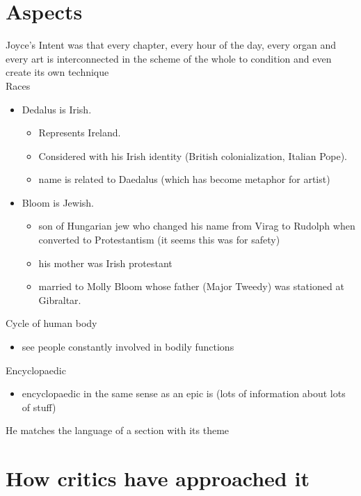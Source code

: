 \documentclass[12pt]{article}
\begin{document}
	\section{Aspects}
		Joyce's Intent was that every chapter, every hour of the day,
		every organ and every art is interconnected in the scheme of the
		whole to condition and even create its own technique \\
		Races
			\begin{itemize}
				\item Dedalus is Irish.
					\begin{itemize}
						\item Represents Ireland.
						\item Considered with his Irish identity
						(British colonialization,
						Italian Pope).
						\item name is related to Daedalus (which has become
						metaphor for artist)
					\end{itemize}
				\item Bloom is Jewish. 
					\begin{itemize}
						\item son of Hungarian jew who changed
						his name from Virag to Rudolph when
						converted to Protestantism (it seems
						this was for safety)
						\item his mother was Irish protestant
						\item married to Molly Bloom whose
						father (Major Tweedy) was stationed at
						Gibraltar.
					\end{itemize}
			\end{itemize}
		Cycle of human body
			\begin{itemize}
				\item see people constantly involved in bodily
				functions
			\end{itemize}
		Encyclopaedic
			\begin{itemize}
				\item encyclopaedic in the same sense as an epic
				is (lots of information about lots of stuff)
			\end{itemize}
		He matches the language of a section with its theme

	\section{How critics have approached it}
\end{document}
